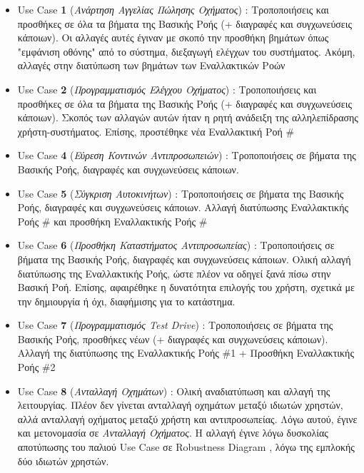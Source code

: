 \documentclass{../ol-softwaremanual}
\begin{document}
	\begin{itemize}
		\item \en Use Case \textbf{1} \gr (\textit{Ανάρτηση Αγγελίας Πώλησης Οχήματος}) : Τροποποιήσεις και προσθήκες σε όλα τα βήματα της Βασικής Ροής (+ διαγραφές και συγχωνεύσεις κάποιων). Οι αλλαγές αυτές έγιναν με σκοπό την προσθήκη βημάτων όπως "εμφάνιση οθόνης" από το σύστημα, διεξαγωγή ελέγχων του συστήματος. Ακόμη, αλλαγές στην διατύπωση των βημάτων των Εναλλακτικών Ροών
		
		\item \en Use Case \textbf{2} \gr (\textit{Προγραμματισμός Ελέγχου Οχήματος}) : Τροποποιήσεις και προσθήκες σε όλα τα βήματα της Βασικής Ροής (+ διαγραφές και συγχωνεύσεις κάποιων). Σκοπός των αλλαγών αυτών ήταν η ρητή ανάδειξη της αλληλεπίδρασης χρήστη-συστήματος. Επίσης, προστέθηκε νέα Εναλλακτική Ροή \en \# 
		
		\item \en Use Case \textbf{4} \gr (\textit{Εύρεση Κοντινών Αντιπροσωπειών}) : Τροποποιήσεις σε βήματα της Βασικής Ροής, διαγραφές και συγχωνεύσεις κάποιων. 
		
		\item \en Use Case \textbf{5} \gr (\textit{Σύγκριση Αυτοκινήτων}) : Τροποποιήσεις σε βήματα της Βασικής Ροής, διαγραφές και συγχωνεύσεις κάποιων. Αλλαγή διατύπωσης Εναλλακτικής Ροής \en \# και προσθήκη Εναλλακτικής Ροής \en \# 
				
		\item \en Use Case \textbf{6} \gr (\textit{Προσθήκη Καταστήματος Αντιπροσωπείας}) : Τροποποιήσεις σε βήματα της Βασικής Ροής, διαγραφές και συγχωνεύσεις κάποιων. Ολική αλλαγή διατύπωσης της Εναλλακτικής Ροής, ώστε πλέον να οδηγεί ξανά πίσω στην Βασική Ροή. Επίσης, αφαιρέθηκε η δυνατότητα επιλογής του χρήστη, σχετικά με την δημιουργία ή όχι, διαφήμισης για το κατάστημα.
		
		\item \en Use Case \textbf{7} \gr (\textit{Προγραμματισμός \en Test Drive\gr}) : Τροποποιήσεις σε βήματα της Βασικής Ροής, προσθήκες νέων (+ διαγραφές και συγχωνεύσεις κάποιων). Αλλαγή της διατύπωσης της Εναλλακτικής Ροής \en \#1 \gr  + Προσθήκη Εναλλακτικής Ροής \en \#2\gr
		
		\item \en Use Case \textbf{8} \gr (\textit{Ανταλλαγή Οχημάτων}) : Ολική αναδιατύπωση και αλλαγή της λειτουργίας. Πλέον δεν γίνεται ανταλλαγή οχημάτων μεταξύ ιδιωτών χρηστών, αλλά ανταλλαγή οχήματος μεταξύ χρήστη και αντιπροσωπείας. Λόγω αυτού, έγινε και μετονομασία σε \textit{Ανταλλαγή Οχήματος}. Η αλλαγή έγινε λόγω δυσκολίας αποτύπωσης του παλιού \en Use Case \gr σε \en Robustness Diagram \gr, λόγω της εμπλοκής δύο ιδιωτών χρηστών.
		

\end{itemize}
\end{document}
